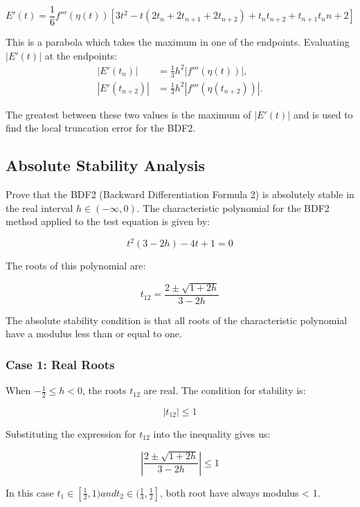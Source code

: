 \documentclass[a4paper,12pt]{article}
\begin{document}
\begin{equation}
E'(t)=\frac{1}{6}f'''(\eta(t))[3t^2 - t(2t_n + 2t_{n+1} + 2t_{n+2}) + t_nt_{n+2} + t_{n+1}t_n{n+2}]
\end{equation}

This is a parabola which takes the maximum in one of the endpoints.
Evaluating $|E'(t)|$ at the endpoints:
\begin{align*}
|E'(t_n)| &= \frac{1}{3}h^2|f'''(\eta(t))| , \\
|E'(t_{n+2})| &= \frac{1}{3}h^2|f'''(\eta(t_{n+2}))|.
\end{align*}

The greatest between these two values is the maximum of $|E'(t)|$ and is used to find the local truncation error for the BDF2. 


\subsection*{Absolute Stability Analysis}

Prove that the BDF2 (Backward Differentiation Formula 2) is absolutely stable in the real interval \( h \in (-\infty, 0) \). The characteristic polynomial for the BDF2 method applied to the test equation is given by:

\begin{equation}
t^2(3 - 2h) - 4t + 1 = 0
\end{equation}

The roots of this polynomial are:

\[
t_{12} = \frac{2 \pm \sqrt{1 + 2h}}{3 - 2h}
\]

The absolute stability condition is that all roots of the characteristic polynomial have a modulus less than or equal to one.

\subsubsection*{Case 1: Real Roots}

When \( -\frac{1}{2} \leq h < 0 \), the roots \( t_{12} \) are real. The condition for stability is:

\[
|t_{12}| \leq 1
\]

Substituting the expression for \( t_{12} \) into the inequality gives us:

\[
\left| \frac{2 \pm \sqrt{1 + 2h}}{3 - 2h} \right| \leq 1
\]

In this case $t_1 \in [\frac{1}{2},1) and t_2 \in (\frac{1}{3},\frac{1}{2}] $, both root have always modulus < 1.
\end{document}
